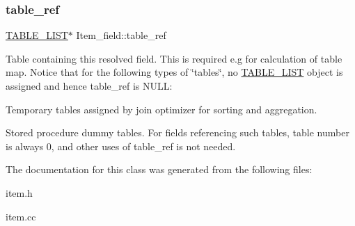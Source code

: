 \subsubsection{\texorpdfstring{table\+\_\+ref}{table\_ref}}
{\footnotesize\ttfamily \mbox{\hyperlink{structTABLE__LIST}{T\+A\+B\+L\+E\+\_\+\+L\+I\+ST}}$\ast$ Item\+\_\+field\+::table\+\_\+ref}

Table containing this resolved field. This is required e.\+g for calculation of table map. Notice that for the following types of \char`\"{}tables\char`\"{}, no \mbox{\hyperlink{structTABLE__LIST}{T\+A\+B\+L\+E\+\_\+\+L\+I\+ST}} object is assigned and hence table\+\_\+ref is N\+U\+LL\+:
\begin{DoxyItemize}
\item Temporary tables assigned by join optimizer for sorting and aggregation.
\item Stored procedure dummy tables. For fields referencing such tables, table number is always 0, and other uses of table\+\_\+ref is not needed. 
\end{DoxyItemize}

The documentation for this class was generated from the following files\+:\begin{DoxyCompactItemize}
\item 
item.\+h\item 
item.\+cc\end{DoxyCompactItemize}
